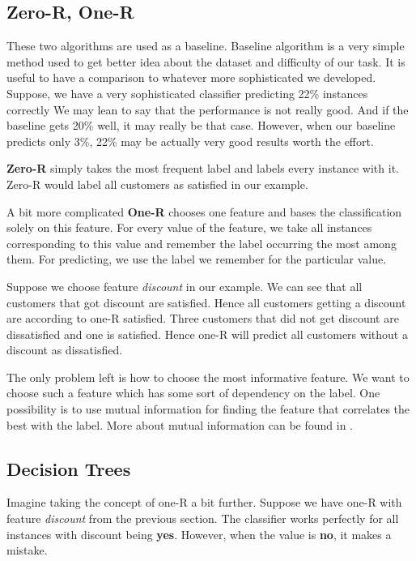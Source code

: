 \subsection{Zero-R, One-R}

These two algorithms are used as a baseline.
Baseline algorithm is a very simple method used to get better idea about the dataset and difficulty of our task.
It is useful to have a comparison to whatever more sophisticated we developed.
Suppose, we have a very sophisticated classifier predicting 22\% instances correctly
We may lean to say that the performance is not really good.
And if the baseline gets 20\% well, it may really be that case.
However, when our baseline predicts only 3\%, 22\% may be actually very good results worth the effort.

{\bf Zero-R} simply takes the most frequent label and labels every instance with it.
Zero-R would label all customers as satisfied in our example.

A bit more complicated {\bf One-R} chooses one feature and bases the classification solely on this feature.
For every value of the feature, we take all instances corresponding to this value and remember the label occurring the most among them.
For predicting, we use the label we remember for the particular value.

Suppose we choose feature \textit{discount} in our example.
We can see that all customers that got discount are satisfied.
Hence all customers getting a discount are according to one-R satisfied.
Three customers that did not get discount are dissatisfied and one is satisfied.
Hence one-R will predict all customers without a discount as dissatisfied.

The only problem left is how to choose the most informative feature.
We want to choose such a feature which has some sort of dependency on the label.
One possibility is to use mutual information for finding the feature
that correlates the best with the label.
More about mutual information can be found in .


\subsection{Decision Trees}\label{subsec:decisiontree}

Imagine taking the concept of one-R a bit further.
Suppose we have one-R with feature \textit{discount} from the previous section.
The classifier works perfectly for all instances with discount being \textbf{yes}.
However, when the value is \textbf{no}, it makes a mistake.

